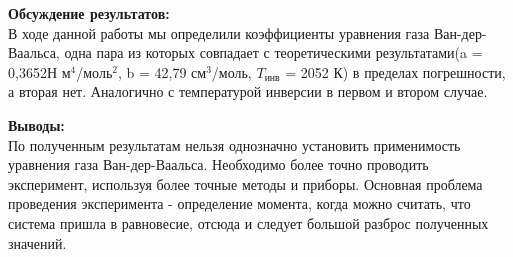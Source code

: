 \documentclass[a4paper, 12pt]{article}%
\begin{document}
	\textbf{Обсуждение результатов: }\\
	В ходе данной работы мы определили коэффициенты уравнения газа  Ван-дер-Ваальса, одна пара из которых совпадает с теоретическими результатами(a = 0,3652Н м$^4$/моль$^2$, b = 42,79 см$^3$/моль, $T_{\text{инв}}$ = 2052 К) в пределах погрешности, а вторая нет. Аналогично с температурой инверсии в первом и втором случае.  


\textbf{Выводы: }\\
По полученным результатам нельзя однозначно установить применимость уравнения газа  Ван-дер-Ваальса. Необходимо более точно проводить эксперимент, используя более точные методы и приборы. Основная проблема проведения эксперимента - определение момента, когда можно считать, что система пришла в равновесие, отсюда и следует большой разброс полученных значений.


	
\end{document}
